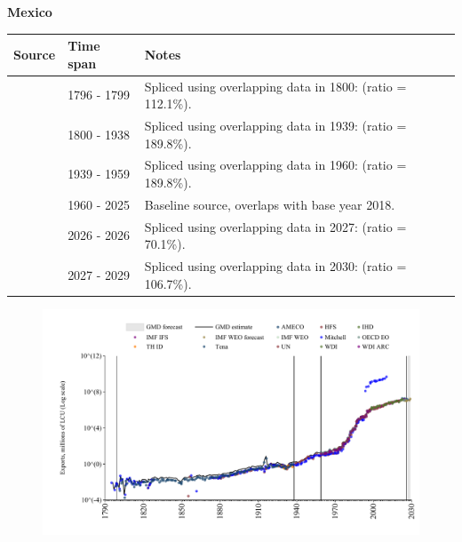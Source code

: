 \documentclass[12pt,a4paper,landscape]{article}
\begin{document}
\begin{adjustbox}{max totalsize={\paperwidth}{\paperheight},center}
\begin{minipage}[t][\textheight][t]{\textwidth}
\vspace*{0.5cm}
{}
\begin{center}
{\Large\bfseries Mexico}
\end{center}
\vspace{0.5cm}
\begin{table}[H]
\centering
\small
\begin{tabular}{|l|l|l|}
\hline
\textbf{Source} & \textbf{Time span} & \textbf{Notes} \\
\hline
\rowcolor{white}\cite{Mitchell}& 1796 - 1799 &Spliced using overlapping data in 1800: (ratio = 112.1\%).\\
\rowcolor{lightgray}\cite{Tena}& 1800 - 1938 &Spliced using overlapping data in 1939: (ratio = 189.8\%).\\
\rowcolor{white}\cite{Mitchell}& 1939 - 1959 &Spliced using overlapping data in 1960: (ratio = 189.8\%).\\
\rowcolor{lightgray}\cite{OECD_EO}& 1960 - 2025 &Baseline source, overlaps with base year 2018.\\
\rowcolor{white}\cite{AMECO}& 2026 - 2026 &Spliced using overlapping data in 2027: (ratio = 70.1\%).\\
\rowcolor{lightgray}\cite{IMF_WEO_forecast}& 2027 - 2029 &Spliced using overlapping data in 2030: (ratio = 106.7\%).\\
\hline
\end{tabular}
\end{table}
\begin{figure}[H]
\centering
\includegraphics[width=\textwidth,height=0.6\textheight,keepaspectratio]{graphs/MEX_exports.pdf}
\end{figure}
\end{minipage}
\end{adjustbox}
\end{document}
